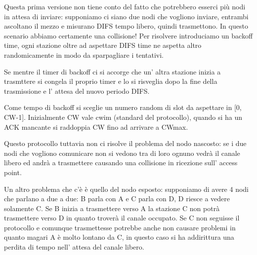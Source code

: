 Questa prima versione non tiene conto del fatto che potrebbero esserci più nodi in attesa di inviare: supponiamo ci siano due nodi che vogliono inviare, entrambi ascoltano il mezzo e misurano DIFS tempo libero, quindi trasmettono.
In questo scenario abbiamo certamente una collisione!
Per risolvere introduciamo un backoff time, ogni stazione oltre ad aspettare DIFS time ne aspetta altro randomicamente in modo da sparpagliare i tentativi.

Se mentre il timer di backoff ci si accorge che un' altra stazione inizia a trasmttere si congela il proprio timer e lo si risveglia dopo la fine della trasmissione e l' attesa del nuovo periodo DIFS.

Come tempo di backoff si sceglie un numero random di slot da aspettare in [0, CW-1].
Inizialmente CW vale cwim (standard del protocollo), quando si ha un ACK mancante si raddoppia CW fino ad arrivare a CWmax.

Questo protocollo tuttavia non ci risolve il problema del nodo nascosto: se i due nodi che vogliono comunicare non si vedono tra di loro ognuno vedrà il canale libero ed andrà a trasmettere causando una collisione in ricezione sull' access point.

Un altro problema che c'è è quello del nodo esposto: supponiamo di avere 4 nodi che parlano a due a due: B parla con A e C parla con D, D riesce a vedere solamente C.
Se B inizia a trasmettere verso A la stazione C non potrà trasmettere verso D in quanto troverà il canale occupato.
Se C non seguisse il protocollo e comunque trasmettesse potrebbe anche non causare problemi in quanto magari A è molto lontano da C, in questo caso si ha addirittura una perdita di tempo nell' attesa del canale libero.

